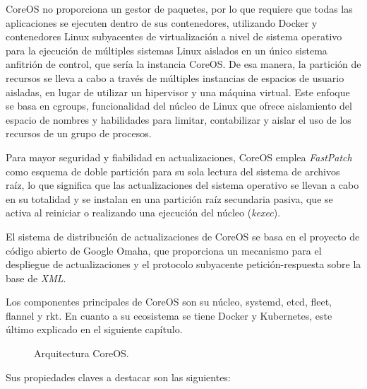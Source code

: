 CoreOS no proporciona un gestor de paquetes, por lo que requiere que todas las aplicaciones se ejecuten dentro de sus contenedores, utilizando Docker y contenedores Linux subyacentes de virtualización a nivel de sistema operativo para la ejecución de múltiples sistemas Linux aislados en un único sistema anfitrión de control, que sería la instancia CoreOS. De esa manera, la partición de recursos se lleva a cabo a través de múltiples instancias de espacios de usuario aisladas, en lugar de utilizar un hipervisor y una máquina virtual. Este enfoque se basa en cgroups, funcionalidad del núcleo de Linux que ofrece aislamiento del espacio de nombres y habilidades para limitar, contabilizar y aislar el uso de los recursos de un grupo de procesos.

Para mayor seguridad y fiabilidad en actualizaciones, CoreOS emplea \textit{FastPatch} como esquema de doble partición para su sola lectura del sistema de archivos raíz, lo que significa que las actualizaciones del sistema operativo se llevan a cabo en su totalidad y se instalan en una partición raíz secundaria pasiva, que se activa al reiniciar o realizando una ejecución del núcleo (\textit{kexec}).

El sistema de distribución de actualizaciones de CoreOS se basa en el proyecto de código abierto de Google Omaha, que proporciona un mecanismo para el despliegue de actualizaciones y el protocolo subyacente petición-respuesta sobre la base de \textit{XML}.

Los componentes principales de CoreOS son su núcleo, systemd, etcd, fleet, flannel y rkt. En cuanto a su ecosistema se tiene Docker y Kubernetes, este último explicado en el siguiente capítulo.

\begin{figure}[H]
\caption{Arquitectura CoreOS.\label{fig:figure_placement_example}}
\end{figure}

Sus propiedades claves a destacar son las siguientes:

